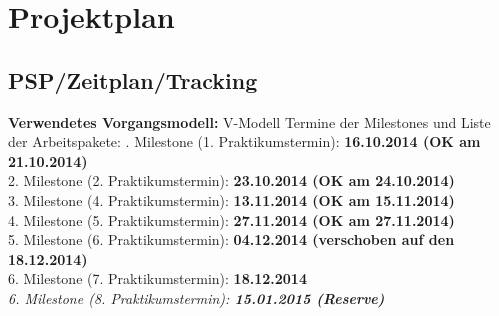 \documentclass[oneside,a4paper,titlepage]{scrartcl} %
\begin{document}
\newpage

\section{Projektplan}

\subsection{PSP/Zeitplan/Tracking}
\textbf{Verwendetes Vorgangsmodell:} V-Modell\newline
\newline
Termine der Milestones und Liste der Arbeitspakete: . Milestone (1. Praktikumstermin): \textbf{16.10.2014 \textbar \space (OK am 21.10.2014)}\\
 2. Milestone (2. Praktikumstermin): \textbf{23.10.2014 \textbar \space (OK am 24.10.2014)}\\
 3. Milestone (4. Praktikumstermin): \textbf{13.11.2014 \textbar \space (OK am 15.11.2014)}\\
 4. Milestone (5. Praktikumstermin): \textbf{27.11.2014 \textbar \space (OK am 27.11.2014)}\\
 5. Milestone (6. Praktikumstermin): \textbf{04.12.2014 \textbar \space (verschoben auf den 18.12.2014)}\\
 6. Milestone (7. Praktikumstermin): \textbf{18.12.2014}\\
 \textit{6. Milestone (8. Praktikumstermin): \textbf{15.01.2015 (Reserve)}}
\end{document}
